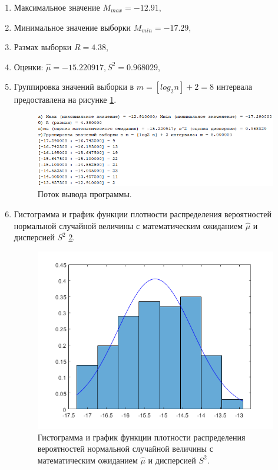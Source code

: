 \documentclass[a4paper,oneside,12pt]{extreport}
\theoremstyle{indented}
\begin{document}
\begin{enumerate}
\item Максимальное значение $M_{max} = -12.91$,
\item Минимальное значение выборки $M_{min} = -17.29$,
\item Размах выборки $R = 4.38$,
\item Оценки: $\hat \mu = -15.220917, S^2 = 0.968029$,
\item Группировка значений выборки в $m = [log_2 n] + 2 = 8$ интервала предоставлена на рисунке \ref{img:output}.

\begin{figure}[H]
\begin{center}
\includegraphics[scale=1]{inc/img/output.png}
\captionsetup{justification=centering}
	\caption{Поток вывода программы.}
	\label{img:output}	
\end{center}
\end{figure}

\item Гистограмма и график функции плотности распределения вероятностей нормальной случайной величины с математическим ожиданием $\hat \mu$ и дисперсией $S^2$ \ref{img:outputGraph}. 

\begin{figure}[H]
\begin{center}
\includegraphics[scale=1]{inc/img/outputGraph.png}
\captionsetup{justification=centering}
	\caption{Гистограмма и график функции плотности распределения вероятностей нормальной случайной величины с математическим ожиданием $\hat \mu$ и дисперсией $S^2$.}
	\label{img:outputGraph}	
\end{center}
\end{figure}


\end{enumerate}
\end{document}
